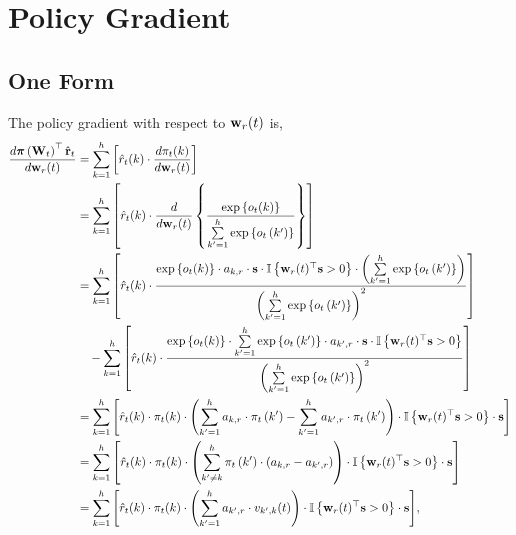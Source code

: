 \section{Policy Gradient}

\subsection{One Form}

The policy gradient with respect to ${\mathbf{w}}_r(t)$ is,
\begin{equation*}
\label{eq:gradient_form_one}
\begin{split}
	\frac{d {\boldsymbol{\pi}}\left( {\mathbf{W}}_t \right)^\top \hat{{\mathbf{r}}}_t}{d {\mathbf{w}}_r(t)} &=  \sum\limits_{k=1}^{h}\left[ \hat{r}_t(k) \cdot \frac{d \pi_t(k)}{d {\mathbf{w}}_r(t)} \right]  \\
	&= \sum\limits_{k=1}^{h}\left[ \hat{r}_t(k) \cdot \frac{d}{d {\mathbf{w}}_r(t)} \left\{ \frac{\exp\left\{ o_t(k) \right\}}{\sum\limits_{k^\prime = 1}^{h}{\exp\left\{ o_{t}\left(k^\prime\right) \right\}}} \right\} \right] \\
	&= \sum\limits_{k=1}^{h}\left[ \hat{r}_t(k) \cdot \frac{ \exp\left\{ o_t(k) \right\} \cdot a_{k,r} \cdot {\mathbf{s}} \cdot {\mathbb{I}}\left\{ {\mathbf{w}}_r(t)^\top {\mathbf{s}} > 0 \right\} \cdot \left( \sum\limits_{k^\prime = 1}^{h}{\exp\left\{ o_{t}\left(k^\prime\right) \right\}} \right) }{ \left( \sum\limits_{k^\prime = 1}^{h}{\exp\left\{ o_{t}\left(k^\prime\right) \right\}} \right)^2 } \right] \\
	&\quad -\sum\limits_{k=1}^{h}\left[ \hat{r}_t(k) \cdot \frac{ \exp\left\{ o_t(k) \right\} \cdot \sum\limits_{k^\prime = 1}^{h}{\exp\left\{ o_{t}\left(k^\prime\right) \right\}} \cdot a_{k^\prime,r} \cdot {\mathbf{s}} \cdot {\mathbb{I}}\left\{ {\mathbf{w}}_r(t)^\top {\mathbf{s}} > 0 \right\} }{ \left( \sum\limits_{k^\prime = 1}^{h}{\exp\left\{ o_{t}\left(k^\prime\right) \right\}} \right)^2 } \right] \\
	&= \sum\limits_{k=1}^{h}{ \left[ \hat{r}_t(k) \cdot \pi_t(k) \cdot \left( \sum\limits_{k^\prime = 1}^{h}{ a_{k,r} \cdot \pi_{t}\left(k^\prime\right) } - \sum\limits_{k^\prime = 1}^{h}{ a_{k^\prime,r} \cdot \pi_{t}\left(k^\prime\right) } \right) \cdot {\mathbb{I}}\left\{ {\mathbf{w}}_r(t)^\top {\mathbf{s}} > 0 \right\} \cdot {\mathbf{s}} \right] } \\
	&= \sum\limits_{k=1}^{h}{ \left[ \hat{r}_t(k) \cdot \pi_t(k) \cdot \left( \sum\limits_{k^\prime \not= k}^{h}{ \pi_{t}\left(k^\prime\right) \cdot \left( a_{k,r} - a_{k^\prime,r} \right)  } \right) \cdot {\mathbb{I}}\left\{ {\mathbf{w}}_r(t)^\top {\mathbf{s}} > 0 \right\} \cdot {\mathbf{s}} \right] } \\
	&= \sum\limits_{k=1}^{h}{ \left[ \hat{r}_t(k) \cdot \pi_t(k) \cdot \left( \sum\limits_{k^\prime = 1}^{h}{ a_{k^\prime,r}  \cdot v_{k^\prime,k}(t) } \right) \cdot {\mathbb{I}}\left\{ {\mathbf{w}}_r(t)^\top {\mathbf{s}} > 0 \right\} \cdot {\mathbf{s}} \right] },
\end{split}
\end{equation*}
